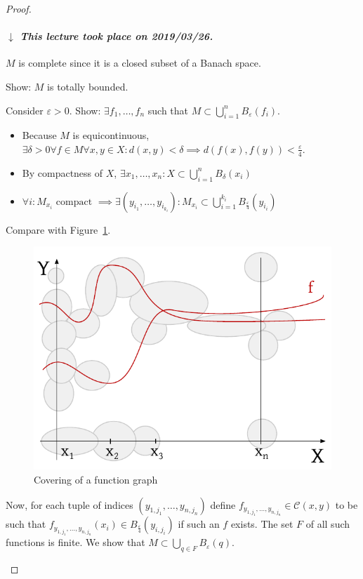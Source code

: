 \documentclass[a4paper]{article}
\numberwithin{lecref}{section}
\newcommand{\dateref}[1]{%
  \begin{mdframed}[backgroundcolor=gray!10,innerbottommargin=0pt,innertopmargin=0pt]
    \paragraph{\textit{$\downarrow$ This lecture took place on #1.}}%
  \end{mdframed}%
}
\begin{document}
\begin{proof}
\begin{enumerate}
\begin{description}
					\dateref{2019/03/26}
					$M$ is complete since it is a closed subset of a Banach space.

					Show: $M$ is totally bounded.

					Consider $\varepsilon > 0$. Show: $\exists f_1, \dots, f_n$ such that $M \subset \bigcup_{i=1}^n B_\varepsilon(f_i)$.

					\begin{itemize}
						\item Because $M$ is equicontinuous, $\exists \delta > 0 \forall f \in M \forall x, y \in X: d(x, y) < \delta \implies d(f(x), f(y)) < \frac\varepsilon4$.
						\item By compactness of $X$, $\exists x_1, \dots, x_n: X \subset \bigcup_{i=1}^n B_\delta(x_i)$
						\item $\forall i: M_{x_i} \text{ compact } \implies \exists (y_{i_1}, \dots, y_{i_{k_i}}): M_{x_i} \subset \bigcup_{i=1}^{k_i} B_{\frac\varepsilon4}(y_{i_i})$
					\end{itemize}

					Compare with Figure~\ref{img:cov}.

					\begin{figure}[t]
						\begin{center}
							\includegraphics{img/covering.pdf}
							\caption{Covering of a function graph}
							\label{img:cov}
						\end{center}
					\end{figure}

					Now, for each tuple of indices $(y_{1,j_1}, \dots, y_{n,j_n})$ define $f_{y_{1,j_1}, \dots, y_{n,j_n}} \in \mathcal C(x, y)$ to be such that $f_{y_{1,j_1},\dots,y_{n,j_n}}(x_i) \in B_{\frac\varepsilon4}(y_{i,j_i})$ if such an $f$ exists. The set $F$ of all such functions is finite. We show that $M \subset \bigcup_{q \in F} B_{\varepsilon}(q)$.


\end{description}
\end{enumerate}
\end{proof}
\end{document}
